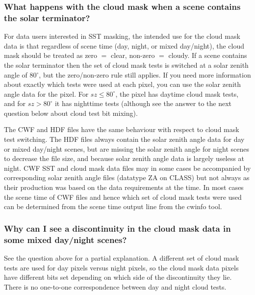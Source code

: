 \subsubsection*{What happens with the cloud mask when a scene contains the solar terminator?}

For data users interested in SST masking, the intended use for the
cloud mask data is that regardless of scene time (day, night, or mixed
day/night), the cloud mask should be treated as zero $=$ clear,
non-zero $=$ cloudy.  If a scene contains the solar terminator then
the set of cloud mask tests is switched at a solar zenith angle of
80${^{\circ}}$, but the zero/non-zero rule still applies.  If you need
more information about exactly which tests were used at each pixel,
you can use the solar zenith angle data for the pixel.  For $sz \leq
80^{\circ}$, the pixel has daytime cloud mask tests, and for $sz >
80^{\circ}$ it has nighttime tests (although see the answer to the
next question below about cloud test bit mixing).

The CWF and HDF files have the same behaviour with respect to cloud
mask test switching.  The HDF files always contain the solar zenith
angle data for day or mixed day/night scenes, but are missing the
solar zenith angle for night scenes to decrease the file size, and
because solar zenith angle data is largely useless at night.  CWF SST
and cloud mask data files may in some cases be accompanied by
corresponding solar zenith angle files (datatype ZA on CLASS) but not
always as their production was based on the data requirements at the
time.  In most cases the scene time of CWF files and hence which set
of cloud mask tests were used can be determined from the scene time
output line from the cwinfo tool.

\subsubsection*{Why can I see a discontinuity in the cloud mask data in some mixed day/night scenes?}

See the question above for a partial explanation.  A different set of
cloud mask tests are used for day pixels versus night pixels, so the
cloud mask data pixels have different bits set depending on which side
of the discontinuity they lie.  There is no one-to-one correspondence
between day and night cloud tests.


